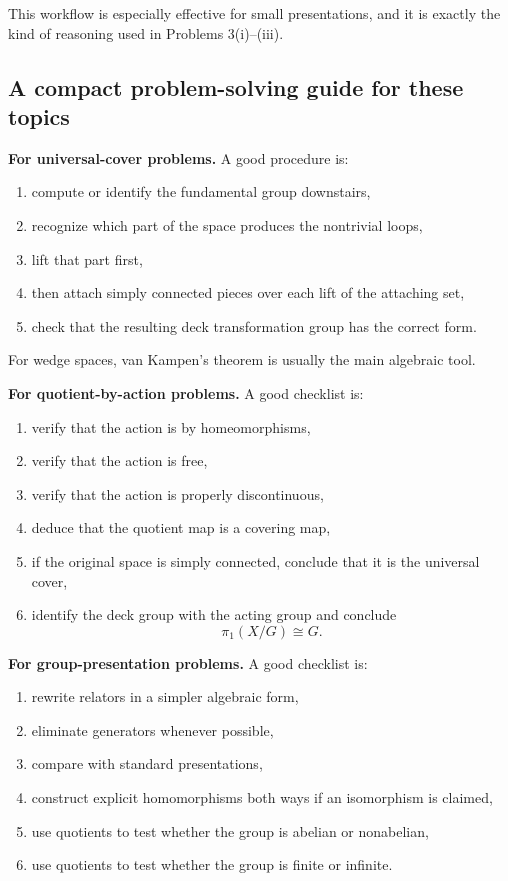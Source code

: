 \documentclass[12pt,a4paper]{article}
\theoremstyle{notespace}
\begin{document}
This workflow is especially effective for small presentations, and it is exactly the kind of reasoning used in Problems 3(i)--(iii).

\bigskip

\subsection{A compact problem-solving guide for these topics}

\textbf{For universal-cover problems.}
A good procedure is:
\begin{enumerate}
	\item compute or identify the fundamental group downstairs,
	\item recognize which part of the space produces the nontrivial loops,
	\item lift that part first,
	\item then attach simply connected pieces over each lift of the attaching set,
	\item check that the resulting deck transformation group has the correct form.
\end{enumerate}

For wedge spaces, van Kampen's theorem is usually the main algebraic tool.

\medskip

\textbf{For quotient-by-action problems.}
A good checklist is:
\begin{enumerate}
	\item verify that the action is by homeomorphisms,
	\item verify that the action is free,
	\item verify that the action is properly discontinuous,
	\item deduce that the quotient map is a covering map,
	\item if the original space is simply connected, conclude that it is the universal cover,
	\item identify the deck group with the acting group and conclude
	\[
	\pi_1(X/G)\cong G.
	\]
\end{enumerate}

\medskip

\textbf{For group-presentation problems.}
A good checklist is:
\begin{enumerate}
	\item rewrite relators in a simpler algebraic form,
	\item eliminate generators whenever possible,
	\item compare with standard presentations,
	\item construct explicit homomorphisms both ways if an isomorphism is claimed,
	\item use quotients to test whether the group is abelian or nonabelian,
	\item use quotients to test whether the group is finite or infinite.
\end{enumerate}
\end{document}
